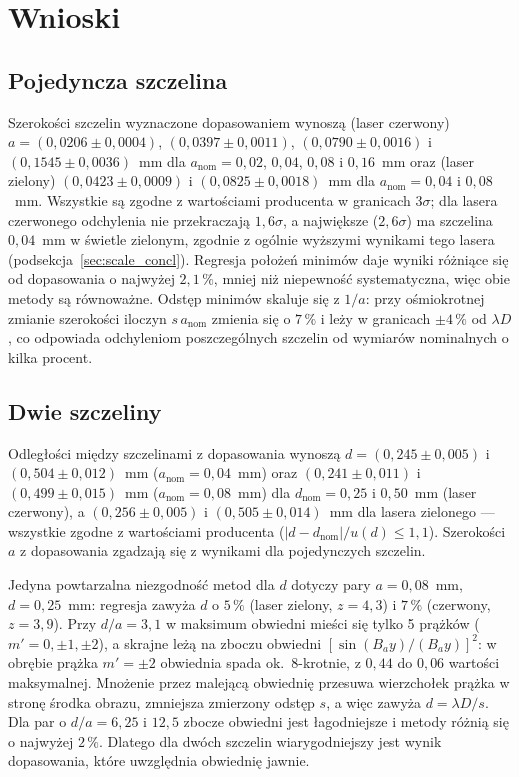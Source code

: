 \documentclass[12pt, a4paper]{article}
\begin{document}
\section{Wnioski}

\subsection{Pojedyncza szczelina}

Szerokości szczelin wyznaczone dopasowaniem wynoszą (laser czerwony)
$a = (0{,}0206 \pm 0{,}0004)$, $(0{,}0397 \pm 0{,}0011)$, $(0{,}0790 \pm 0{,}0016)$
i $(0{,}1545 \pm 0{,}0036)$~mm dla $a_\text{nom} = 0{,}02$, $0{,}04$, $0{,}08$ i $0{,}16$~mm
oraz (laser zielony) $(0{,}0423 \pm 0{,}0009)$ i $(0{,}0825 \pm 0{,}0018)$~mm dla
$a_\text{nom} = 0{,}04$ i $0{,}08$~mm. Wszystkie są zgodne z wartościami producenta w granicach
$3\sigma$; dla lasera czerwonego odchylenia nie przekraczają $1{,}6\sigma$, a największe ($2{,}6\sigma$)
ma szczelina $0{,}04$~mm w świetle zielonym, zgodnie z ogólnie wyższymi wynikami tego lasera
(podsekcja~\ref{sec:scale_concl}). Regresja położeń minimów daje wyniki różniące
się od dopasowania o najwyżej $2{,}1\,\%$, mniej niż niepewność systematyczna, więc obie metody
są równoważne. Odstęp minimów skaluje się z $1/a$: przy ośmiokrotnej zmianie szerokości iloczyn
$s\,a_\text{nom}$ zmienia się o $7\,\%$ i leży w granicach $\pm4\,\%$ od $\lambda D$, co odpowiada
odchyleniom poszczególnych szczelin od wymiarów nominalnych o kilka procent.

\subsection{Dwie szczeliny}

Odległości między szczelinami z dopasowania wynoszą $d = (0{,}245 \pm 0{,}005)$
i $(0{,}504 \pm 0{,}012)$~mm ($a_\text{nom} = 0{,}04$~mm) oraz $(0{,}241 \pm 0{,}011)$
i $(0{,}499 \pm 0{,}015)$~mm ($a_\text{nom} = 0{,}08$~mm) dla $d_\text{nom} = 0{,}25$ i $0{,}50$~mm
(laser czerwony), a $(0{,}256 \pm 0{,}005)$ i $(0{,}505 \pm 0{,}014)$~mm dla lasera zielonego ---
wszystkie zgodne z wartościami producenta ($|d - d_\text{nom}|/u(d) \le 1{,}1$). Szerokości $a$
z dopasowania zgadzają się z wynikami dla pojedynczych szczelin.

Jedyna powtarzalna niezgodność metod dla $d$ dotyczy pary $a = 0{,}08$~mm, $d = 0{,}25$~mm:
regresja zawyża $d$ o $5\,\%$ (laser zielony, $z = 4{,}3$) i $7\,\%$ (czerwony, $z = 3{,}9$).
Przy $d/a = 3{,}1$ w maksimum obwiedni mieści się tylko 5 prążków ($m' = 0, \pm1, \pm2$), a skrajne
leżą na zboczu obwiedni $\left[\sin(B_a y)/(B_a y)\right]^2$: w obrębie prążka $m' = \pm2$
obwiednia spada ok.\ 8-krotnie, z $0{,}44$ do $0{,}06$ wartości maksymalnej. Mnożenie przez
malejącą obwiednię przesuwa wierzchołek prążka w stronę środka obrazu, zmniejsza zmierzony
odstęp $s$, a więc zawyża $d = \lambda D/s$. Dla par o $d/a = 6{,}25$ i $12{,}5$ zbocze obwiedni
jest łagodniejsze i metody różnią się o najwyżej $2\,\%$. Dlatego dla dwóch szczelin
wiarygodniejszy jest wynik dopasowania, które uwzględnia obwiednię jawnie.
\end{document}
